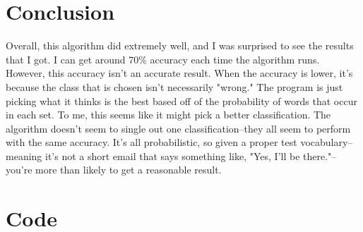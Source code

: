 \documentclass[11pt]{article}
\begin{document}
\section{Conclusion}
Overall, this algorithm did extremely well, and I was surprised to see the results that I got.  I can get around 70\% accuracy each time the algorithm runs.  However, this accuracy isn't an accurate result.  When the accuracy is lower, it's because the class that is chosen isn't necessarily "wrong."  The program is just picking what it thinks is the best based off of the probability of words that occur in each set.  To me, this seems like it might pick a better classification.
\newline\newline
The algorithm doesn't seem to single out one classification--they all seem to perform with the same accuracy.  It's all probabilistic, so given a proper test vocabulary--meaning it's not a short email that says something like, "Yes, I'll be there."--you're more than likely to get a reasonable result.
\newpage
\section{Code}

\end{document}
